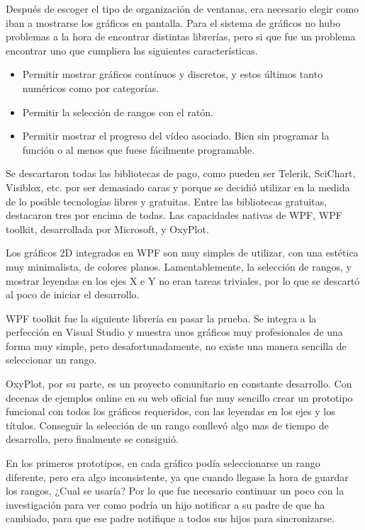 Despu\'es de escoger el tipo de organizaci\'on de ventanas, era necesario elegir como iban a mostrarse los gr\'aficos en pantalla.
Para el sistema de gr\'aficos no hubo problemas a la hora de encontrar distintas librer\'ias, pero si que fue un 
problema encontrar uno que cumpliera las siguientes caracter\'isticas.

\begin{itemize}
	\item Permitir mostrar gr\'{a}ficos cont\'{i}nuos y discretos, y estos \'{u}ltimos tanto num\'{e}ricos como por categor\'{i}as.
	\item Permitir la selecci\'{o}n de rangos con el rat\'{o}n.
	\item Permitir mostrar el progreso del v\'{i}deo asociado. Bien sin programar la funci\'{o}n o al menos que fuese f\'{a}cilmente programable.
\end{itemize}

Se descartaron todas las bibliotecas de pago, como pueden ser Telerik, SciChart, Visiblox, etc. por ser demasiado caras
y porque se decidi\'o utilizar en la medida de lo posible tecnolog\'ias libres y gratuitas. Entre las bibliotecas
gratuitas, destacaron tres por encima de todas. Las capacidades nativas de WPF,
WPF toolkit, desarrollada por Microsoft, y OxyPlot.

Los gr\'aficos 2D integrados en WPF son muy simples de utilizar, con una est\'etica muy minimalista, de colores planos.
Lamentablemente, la selecci\'on de rangos, y mostrar leyendas en los ejes X e Y no eran tareas triviales, por lo que
se descart\'o al poco de iniciar el desarrollo.

WPF toolkit fue la siguiente librer\'ia en pasar la prueba. Se integra a la perfecci\'on 
en Visual Studio y muestra unos gr\'aficos muy profesionales de una forma
muy simple, pero desafortunadamente, no existe una manera sencilla de seleccionar un rango.

OxyPlot, por su parte, es un proyecto comunitario en constante desarrollo. Con decenas de ejemplos online en su web
oficial fue muy sencillo crear un prototipo funcional con todos los gr\'aficos requeridos, con las leyendas en los ejes
y los t\'itulos. Conseguir la selecci\'on de un rango conllev\'o algo mas de tiempo de desarrollo, pero finalmente 
se consigui\'o.

En los primeros prototipos, en cada gr\'afico pod\'ia seleccionarse un rango diferente, pero era algo inconsistente, ya
que cuando llegase la hora de guardar los rangos, ¿Cual se usar\'ia? Por lo que fue necesario continuar un poco con la 
investigaci\'on para ver como podr\'ia un hijo notificar a su padre de que ha cambiado, para que ese padre notifique a todos
sus hijos para sincronizarse.

